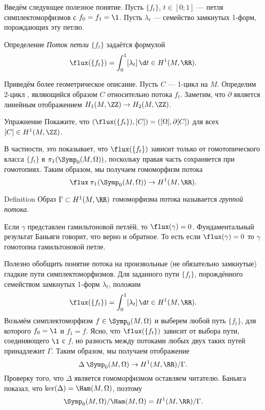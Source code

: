 Введём следующее полезное понятие.
Пусть $\{f_t\}$, $t\in[0;1]$ — петля симплектоморфизмов с $f_0 = f_1 = \1$.
Пусть ${\lambda_t}$ — семейство замкнутых 1-форм, порождающих эту петлю.

\begin{ex*}{Определение}
\emph{Поток петли} $\{f_t\}$ задаётся формулой
\index[symb]{$\flux$} 
\[\flux(\{f_t\}) = \int_0^1 [\lambda_t]\,\d t \in H^1(M, \RR).\]
\end{ex*}

Приведём более геометрическое описание.
Пусть $C$ — 1-цикл на $M$.
Определим 2-цикл , являющийся образом $C$ относительно потока $f_t$. 
Заметим, что $\partial$ является линейным отображением $H_1(M,\ZZ)\to H_2(M,\ZZ)$.

\begin{ex*}{Упражнение}
Покажите, что $(\flux(\{f_t\}), [C]) = ([\Omega], \partial[C])$ для
всех $[C]\in H^1(M,\ZZ)$.
\end{ex*}

В частности, это показывает, что $\flux(\{f_t\})$ зависит только от гомотопического класса $\{f_t\}$ в $\pi_1 (\Symp_0(M,\Omega))$, поскольку правая часть сохраняется при гомотопиях.
Таким образом, мы получаем гомоморфизм потока
\[\flux\:\pi_1(\Symp_0(M,\Omega))\to H^1(M,\RR).\]

\begin{ex*}{Definition}
Образ $\Gamma \subset H^1(M, \RR)$ гомоморфизма потока называется
\emph{группой потока}. 
\end{ex*}


Если $\gamma$ представлен гамильтоновой петлёй, то $\flux(\gamma) = 0$.
Фундаментальный результат Баньяги \cite{B1} говорит,
что верно и обратное. 
То есть если $\flux(\gamma) = 0$ то $\gamma$ гомотопна гамильтоновой петле.

Полезно обобщить понятие потока на произвольные (не обязательно
замкнутые) гладкие пути симплектоморфизмов. 
Для заданного пути $\{f_t\}$, порождённого семейством замкнутых 1-форм
$\lambda_t$, положим  
\[\flux(\{f_t\})=\int_0^1[\lambda_t]\,\d t\in H^1(M,\RR).\]
Возьмём симплектоморфизм $f \in \Symp_0(M,\Omega)$ и выберем любой
путь $\{f_t\}$, для которого $f_0 = \1$ и $f_1 = f$.
Ясно, что $\flux (\{f_t\})$ зависит от выбора пути, соединяющего $\1$
с $f$, но разность между потоками любых двух таких путей принадлежит
$\Gamma$. 
Таким образом, мы получаем отображение
\[\Delta\:\Symp_0(M,\Omega)\to H^1(M,\RR)/\Gamma.\]
Проверку того, что $\Delta$ является гомоморфизмом оставляем читателю.
Баньяга показал, что $\ker(\Delta) = \Ham(M,\Omega)$, поэтому 
\[\Symp_0(M,\Omega)/\Ham(M,\Omega) = H^1(M, \RR)/\Gamma.\]

